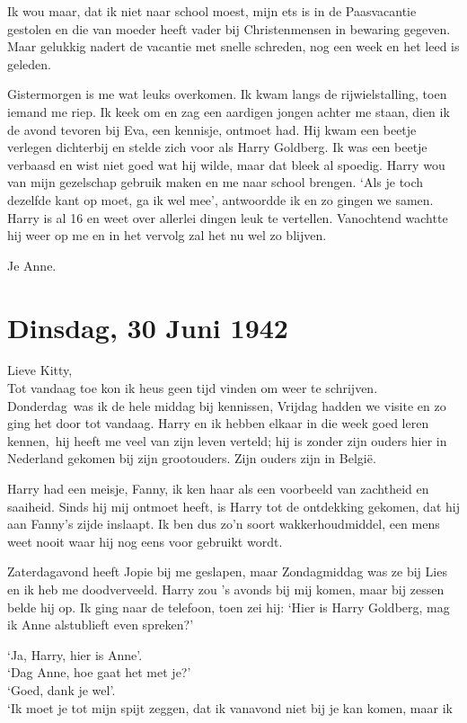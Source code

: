 \documentclass{book}
\begin{document}
Ik wou maar, dat ik niet naar school moest, mijn ets is in de
Paasvacantie gestolen en die van moeder heeft vader bij Christenmensen
in bewaring gegeven. Maar gelukkig nadert de vacantie met snelle
schreden, nog een week en het leed is geleden.

Gistermorgen is me wat leuks overkomen. Ik kwam langs de
rijwielstalling, toen iemand me riep. Ik keek om en zag een aardigen
jongen achter me staan, dien ik de avond tevoren bij Eva, een kennisje,
ontmoet had. Hij kwam een beetje verlegen dichterbij en stelde zich voor
als Harry Goldberg. Ik was een beetje verbaasd en wist niet goed wat hij
wilde, maar dat bleek al spoedig. Harry wou van mijn gezelschap gebruik
maken en me naar school brengen. `Als je toch dezelfde kant op moet, ga
ik wel mee', antwoordde ik en zo gingen we samen. Harry is al 16 en weet
over allerlei dingen leuk te vertellen. Vanochtend wachtte hij weer op
me en in het vervolg zal het nu wel zo blijven.

Je Anne.

\chapter{Dinsdag, 30 Juni 1942}

Lieve Kitty,\\Tot vandaag toe kon ik heus geen tijd vinden om weer te
schrijven. Donderdag~was ik de hele middag bij kennissen, Vrijdag hadden
we visite en zo ging het door tot vandaag. Harry en ik hebben elkaar in
die week goed leren kennen,~hij heeft me veel van zijn leven verteld;
hij is zonder zijn ouders hier in Nederland gekomen bij zijn
grootouders. Zijn ouders zijn in België.

Harry had een meisje, Fanny, ik ken haar als een voorbeeld van zachtheid
en saaiheid. Sinds hij mij ontmoet heeft, is Harry tot de ontdekking
gekomen, dat hij aan Fanny's zijde inslaapt. Ik ben dus zo'n soort
wakkerhoudmiddel, een mens weet nooit waar hij nog eens voor gebruikt
wordt.

Zaterdagavond heeft Jopie bij me geslapen, maar Zondagmiddag was ze bij
Lies en ik heb me doodverveeld. Harry zou 's avonds bij mij komen, maar
bij zessen belde hij op. Ik ging naar de telefoon, toen zei hij: `Hier
is Harry Goldberg, mag ik Anne alstublieft even spreken?'

`Ja, Harry, hier is Anne'.\\`Dag Anne, hoe gaat het met je?'\\`Goed,
dank je wel'.\\`Ik moet je tot mijn spijt zeggen, dat ik vanavond niet
bij je kan komen, maar ik
\end{document}
